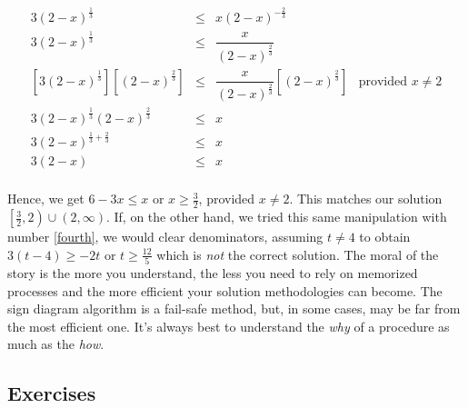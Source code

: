 \documentclass{ximera}
\begin{document}
\[ \begin{array}{rclr}

3 (2-x)^{\frac{1}{3}} & \leq & x (2-x)^{-\frac{2}{3}} & \\

3 (2-x)^{\frac{1}{3}} & \leq & \dfrac{x}{(2-x)^{\frac{2}{3}}} & \\

\left[3 (2-x)^{\frac{1}{3}} \right] \left[  (2-x)^{\frac{2}{3}}\right]& \leq & \dfrac{x}{(2-x)^{\frac{2}{3}}}  \left[  (2-x)^{\frac{2}{3}}\right]&  \text{provided $x \neq 2$} \\
3 (2-x)^{\frac{1}{3}} (2-x)^{\frac{2}{3}} & \leq & x&  \\

3 (2-x)^{\frac{1}{3}+\frac{2}{3}} & \leq & x& \\

3(2-x) & \leq & x  & \\ \end{array} \]

Hence, we get $6-3x \leq x$ or $x \geq \frac{3}{2}$, provided $x \neq 2$. This matches our solution $\left[\frac{3}{2},2\right) \cup (2, \infty)$.  If, on the other hand, we tried this same manipulation with number \ref{fourth}, we would clear denominators, assuming $t \neq 4$ to obtain $3(t-4) \geq -2t$ or $t \geq \frac{12}{5}$ which is \textit{not} the correct solution.  The moral of the story is the more you understand, the less you need to rely on memorized processes and the more efficient your solution methodologies can become.  The sign diagram algorithm is a fail-safe method, but, in some cases, may be far from the most efficient one.  It's always best to understand the \textit{why} of a procedure as much as the \textit{how}.  

\newpage

\subsection{Exercises}



\closegraphsfile
\end{document}
